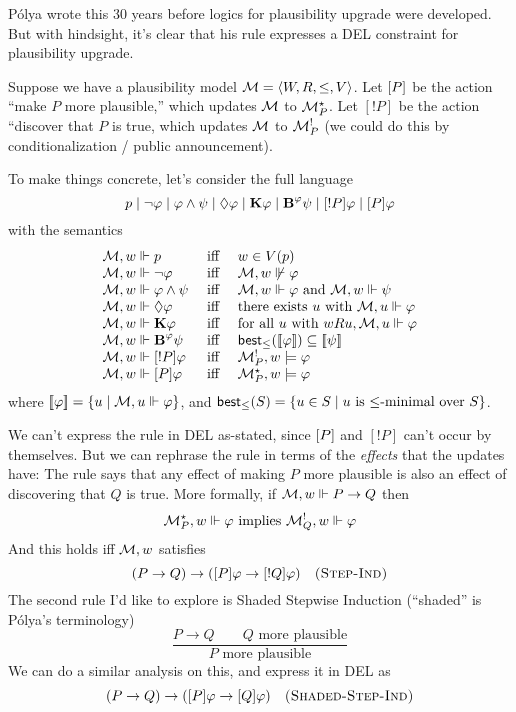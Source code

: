 \documentclass[letterpaper]{article}
\begin{document}
P\'{o}lya wrote this 30 years before logics for plausibility upgrade were developed.  But with hindsight, it's clear that his rule expresses a DEL constraint for plausibility upgrade.  

Suppose we have a plausibility model $\mathcal{M} = \langle W, R, \leq, V \rangle$.  Let $[P]$ be the action ``make $P$ more plausible,'' which updates $\mathcal{M}$ to $\mathcal{M}^{\star}_P$.  Let $[!P]$ be the action ``discover that $P$ is true, which updates $\mathcal{M}$ to $\mathcal{M}^{!}_P$ (we could do this by conditionalization / public announcement).

To make things concrete, let's consider the full language
\[
    p \mid \neg \varphi \mid \varphi \land \psi \mid \Diamond \varphi \mid \textrm{\textup{\textbf{K}}} \varphi \mid \textrm{\textup{\textbf{B}}}^{\varphi} \psi \mid [!P] \varphi \mid [P] \varphi
\]
with the semantics
\[
    \begin{array}{lcl}
        \mathcal{M}, w \Vdash p & \mbox{ iff } & w \in V(p)\\
        \mathcal{M}, w \Vdash \neg \varphi & \mbox{ iff } & \mathcal{M}, w \not \Vdash \varphi\\
        \mathcal{M}, w \Vdash \varphi \land \psi & \mbox{ iff } & \mathcal{M}, w \Vdash \varphi \mbox{ and } \mathcal{M}, w \Vdash \psi\\
        \mathcal{M}, w \Vdash \Diamond \varphi & \mbox{ iff } & \mbox{there exists } u \mbox{ with } \mathcal{M}, u \Vdash \varphi\\
        \mathcal{M}, w \Vdash \textrm{\textup{\textbf{K}}} \varphi & \mbox{ iff } & \mbox{for all } u \mbox{ with } w{R}u, \mathcal{M}, u \Vdash \varphi \\
        \mathcal{M}, w \Vdash \textrm{\textup{\textbf{B}}}^{\varphi} \psi & \mbox{ iff } & \mathsf{best}_\leq([\![\mbox{\em $ \varphi $\/}]\!]) \subseteq [\![\mbox{\em $ \psi $\/}]\!] \\
        \mathcal{M}, w \Vdash [!P] \varphi & \mbox{ iff } & \mathcal{M}^{!}_P, w \models \varphi\\
        \mathcal{M}, w \Vdash [P] \varphi & \mbox{ iff } & \mathcal{M}^\star_P, w \models \varphi
    \end{array}
\]
where $[\![\mbox{\em $ \varphi $\/}]\!] = \{ u \mid \mathcal{M}, u \Vdash \varphi \}$, and $\mathsf{best}_\leq(S) = \{ u \in S \mid u \mbox{ is } {\leq}\mbox{-minimal over } S \}$.

We can't express the rule in DEL as-stated, since $[P]$ and $[!P]$ can't occur by themselves.  But we can rephrase the rule in terms of the \emph{effects} that the updates have: The rule says that any effect of making $P$ more plausible is also an effect of discovering that $Q$ is true.  More formally, if $\mathcal{M}, w \Vdash P \to Q$ then
\[
    \mathcal{M}^{\star}_P, w \Vdash \varphi \mbox{ implies } \mathcal{M}^{!}_Q, w \Vdash \varphi
\]
And this holds iff $\mathcal{M}, w$ satisfies
\[
    (P \to Q) \to ([P] \varphi \to [!Q] \varphi) \quad \mbox{\textsc{(Step-Ind)}}
\]
The second rule I'd like to explore is Shaded Stepwise Induction (``shaded'' is P\'{o}lya's terminology)
\[
    \frac{P \to Q \quad \quad Q \mbox{ more plausible}}{P \mbox{ more plausible}}
\]
We can do a similar analysis on this, and express it in DEL as
\[
    (P \to Q) \to ([P] \varphi \to [Q] \varphi) \quad \mbox{\textsc{(Shaded-Step-Ind)}}
\]
\end{document}
